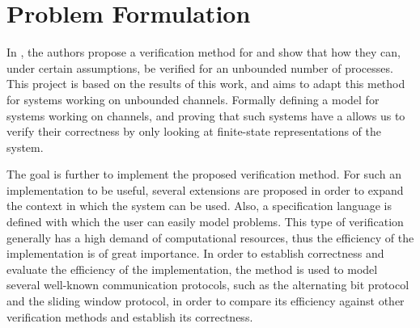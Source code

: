 
\section{Problem Formulation}
In \cite{parosh}, the authors propose a verification method for  and show that how they can, under certain assumptions, be verified for an unbounded number of processes. This project is based on the results of this work, and aims to adapt this method for systems working on unbounded channels. Formally defining a model for systems working on channels, and proving that such systems have a  allows us to verify their correctness by only looking at finite-state representations of the system.

The goal is further to implement the proposed verification method. For such an implementation to be useful, several extensions are proposed in order to expand the context in which the system can be used. Also, a specification language is defined with which the user can easily model problems. This type of verification generally has a high demand of computational resources, thus the efficiency of the implementation is of great importance. In order to establish correctness and evaluate the efficiency of the implementation, the method is used to model several well-known communication protocols, such as the alternating bit protocol and the sliding window protocol, in order to compare its efficiency against other verification methods and establish its correctness.
